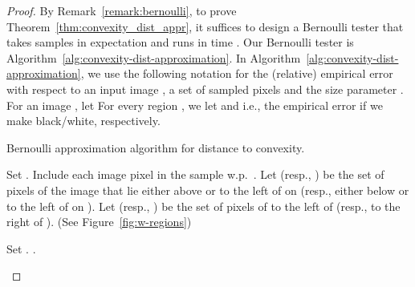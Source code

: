 \documentclass[11pt,english]{article}
\numberwithin{figure}{section}
\begin{document}
\begin{proof}
By Remark~\ref{remark:bernoulli}, to prove Theorem~\ref{thm:convexity_dist_appr}, it suffices to design a Bernoulli tester that takes  samples in expectation and runs in time . Our Bernoulli tester is Algorithm~\ref{alg:convexity-dist-approximation}.
In Algorithm~\ref{alg:convexity-dist-approximation}, we use the following notation for the (relative) empirical error with respect to an input image , a set of sampled pixels  and the size parameter . For an image , let
 For every region , we let
 and
 i.e., the empirical error if we make  black/white, respectively.

\begin{algorithm}
\caption{Bernoulli approximation algorithm for distance to convexity.}
\label{alg:convexity-dist-approximation}
\DontPrintSemicolon
\BlankLine
\nl\label{step:convexity-approx:sample}
Set .
Include each image pixel in the sample  w.p.\ .\;
\nl
Let  (resp., ) be the set of pixels of the image  that lie either above  or to the left of  on  (resp., either below  or to the left of  on ). Let  (resp., ) be the set of pixels of  to the left of  (resp., to the right of ). \ifnum{} (See Figure~\ref{fig:w-regions})\fi


\nl
Set .
\;
\nl\label{step:polygons-foreach-top-bottom}
         
\nl         \Return .
\end{algorithm}


\end{proof}
\end{document}
